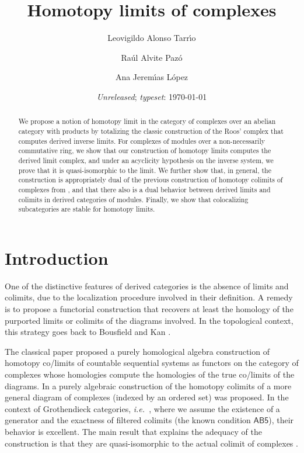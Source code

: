 \documentclass[reqno,11pt]{amsart}
\title{Homotopy limits of complexes}
\author[L. Alonso]{Leovigildo Alonso Tarr\'{\i}o \orcidlink{0000-0002-6896-0652}}
\author[R. Alvite]{Ra\'ul Alvite Paz\'o \orcidlink{0009-0007-1753-7057}}
\author[A. Jerem\'{\i}as]{Ana Jerem\'{\i}as L\'opez \orcidlink{0000-0001-7964-1334}}
\date{\emph{Unreleased}; \emph{typeset}: \today}
\theoremstyle{plain}
\theoremstyle{remark}
\theoremstyle{definition}
\numberwithin{equation}{thm}
\newcommand{\ie}{{\it i.e.~}}
\begin{document}
	
\begin{abstract} 
We propose a notion of homotopy limit in the category of complexes over an abelian category with products by totalizing the classic construction of the Roos' complex that computes derived inverse limits. For complexes of modules over a non-necessarily commutative ring, we show that our construction of homotopy limits computes the derived limit complex, and under an acyclicity hypothesis on the inverse system, we prove that it is quasi-isomorphic to the limit. We further show that, in general, the construction is appropriately dual of the previous construction of homotopy colimits of complexes from \cite{AJS}, and that there also is a dual behavior between derived limits and colimits in derived categories of modules. Finally, we show that colocalizing subcategories are stable for homotopy limits.
\end{abstract}
	
\maketitle
\tableofcontents
	
	
\section*{Introduction}
	
One of the distinctive features of derived categories is the absence of limits and colimits, due to the localization procedure involved in their definition. A remedy is to propose a functorial construction that recovers at least the homology of the purported limits or colimits of the diagrams involved. In the topological context, this strategy goes back to Bousfield and Kan \cite{BK}.

The classical paper \cite{BN} proposed a purely homological algebra construction of homotopy co/limits of countable sequential systems as functors on the category of complexes whose homologies compute the homologies of the true co/limits of the diagrams. In \cite{AJS} a purely algebraic construction of the homotopy colimits of a more general diagram of complexes (indexed by an ordered set) was proposed. In the context of Grothendieck categories, \ie, where we assume the existence of a generator and the exactness of filtered colimits (the known condition $\mathsf{AB5}$), their behavior is excellent. The main result that explains the adequacy of the construction is that they are quasi-isomorphic to the actual colimit of complexes \cite[Theorem 2.2]{AJS}. 
\end{document}
